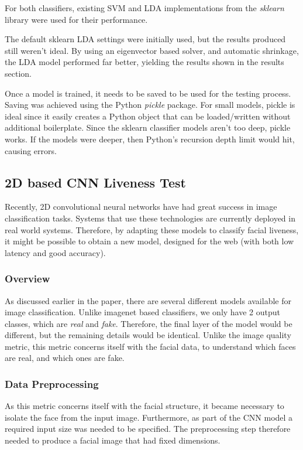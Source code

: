 \documentclass[10pt,a4paper]{article}
\begin{document}
            For both classifiers, existing SVM and LDA implementations from the \emph{sklearn} library were used for their performance. 
            
            The default sklearn LDA settings were initially used, but the results produced still weren't ideal. By using an eigenvector based solver, and automatic shrinkage, the LDA model performed far better, yielding the results
            shown in the results section.

            Once a model is trained, it needs to be saved to be used for the testing process. Saving was achieved using the Python \emph{pickle} package. For small models, pickle is ideal since it easily creates a Python object that can be loaded/written
            without additional boilerplate. Since the sklearn classifier models aren't too deep, pickle works. If the models were deeper, then Python's recursion depth limit would hit, causing errors. 
     
            
        \subsection{2D based CNN Liveness Test}
        Recently, 2D convolutional neural networks have had great success in image classification tasks. Systems that use these technologies are currently deployed in real world systems.
        Therefore, by adapting these models to classify facial liveness, it might be possible to obtain a new model, designed for the web (with both low latency and good accuracy).
       
        

        \subsubsection{Overview}
            As discussed earlier in the paper, there are several different models available for image classification. Unlike imagenet based classifiers, we only have 2 output classes, which are \emph{real} and \emph{fake}.
            Therefore, the final layer of the model would be different, but the remaining details would be identical. Unlike the image quality metric, this metric concerns itself with the facial data, to understand which faces
            are real, and which ones are fake.

        \subsubsection{Data Preprocessing}
            As this metric concerns itself with the facial structure, it became necessary to isolate the face from the input image. Furthermore, as part of the CNN model a required input size was needed to be specified. 
            The preprocessing step therefore needed to produce a facial image that had fixed dimensions.
\end{document}
